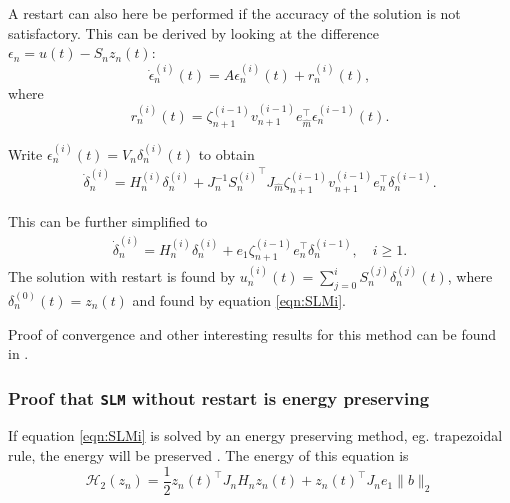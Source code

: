 \noindent A restart can also here be performed if the accuracy of the solution is not satisfactory. This can be derived by looking at the difference $ \epsilon_n = u(t) - S_n z_n(t)$: %
\begin{equation}
\dot{\epsilon}_n^{(i)}(t) = A \epsilon_n^{(i)}(t) + r_n^{(i)}(t),
\label{eqn:resenerg}
\end{equation}
where
\begin{equation*}
r_n^{(i)}(t) = \zeta_{n+1}^{(i-1)} v_{n+1}^{(i-1)} e_{\hat{m}}^\top \epsilon_n^{(i-1)}(t).
\end{equation*}

\noindent Write $ \epsilon^{(i)}_n(t)  = V_n \delta_n^{(i)}(t) $ to obtain
\begin{equation*}
\begin{aligned}
\dot{\delta}_n^{(i)} = H_n^{(i)} \delta_n^{(i)} + J^{-1}_n {S_n^{(i)}}^\top J_{\hat{m}} \zeta_{n+1}^{(i-1)}v_{n+1}^{(i-1)} e_n^\top \delta_n^{(i-1)}.
\end{aligned}
\end{equation*}

\noindent This can be further simplified to
\begin{equation}
\begin{aligned}
\dot{\delta}_n^{(i)} = H_n^{(i)} \delta_n^{(i)} + e_1 \zeta_{n+1}^{(i-1)} e_n^\top \delta_n^{(i-1)}, \quad i \geq 1.
\label{eqn:SLMr}
\end{aligned}
\end{equation}
\noindent The solution with restart is found by $ u_n^{(i)}(t) = \sum \limits_{j = 0} ^i S_n^{(j)} \delta_n^{(j)} (t) $, where $\delta_n^{(0)} (t) = z_n(t)$ and found by equation \eqref{eqn:SLMi}. %

\noindent Proof of convergence and other interesting results for this method can be found in \cite{SLMinteresting}. 

\subsubsection{Proof that \texttt{SLM} without restart is energy preserving} %
If equation \eqref{eqn:SLMi} is solved by an energy preserving method, eg. trapezoidal rule, the energy will be preserved \cite{SLMpreserve}. The energy of this equation is
\begin{equation*}
\mathcal{H}_2(z_n) = \frac{1}{2}z_n(t)^\top J_n H_n z_n(t) + z_n(t)^\top J_n e_1 \|b \|_2
\end{equation*}

